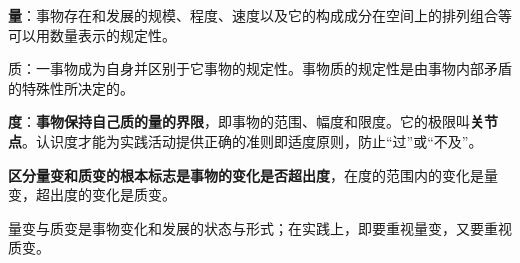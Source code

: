 {\textbf{量}}：事物存在和发展的规模、程度、速度以及它的构成成分在空间上的排列组合等可以用数量表示的规定性。

质：一事物成为自身并区别于它事物的规定性。事物质的规定性是由事物内部矛盾的特殊性所决定的。

\textbf{{度}}：\textbf{{事物保持自己质的量的界限}}，即事物的范围、幅度和限度。它的极限叫\textbf{{关节点}}。认识度才能为实践活动提供正确的准则即适度原则，防止``过''或``不及''。

\textbf{{区分量变和质变的根本标志是事物的变化是否超出度}}，在度的范围内的变化是量变，超出度的变化是质变。

{量变与质变是事物变化和发展的状态与形式；在实践上，即要重视量变，又要重视质变。}
